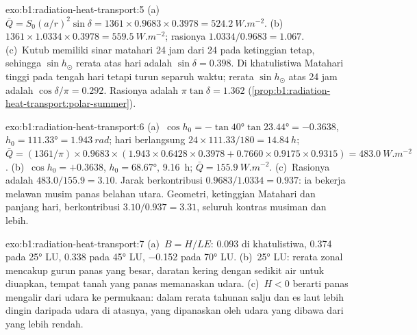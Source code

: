 \begin{solution}{exo:b1:radiation-heat-transport:5}
(a)~$\bar Q = S_0(a/r)^2\sin\delta = 1361 \times 0.9683 \times 0.3978 =
\qty{524.2}{W.m^{-2}}$. (b)~$1361 \times 1.0334 \times 0.3978 =
\qty{559.5}{W.m^{-2}}$; rasionya $1.0334/0.9683 = 1.067$. (c)~Kutub memiliki
sinar matahari 24 jam dari 24 pada ketinggian tetap, sehingga $\sin h_\odot$ rerata atas
hari adalah $\sin\delta = 0.398$. Di khatulistiwa Matahari tinggi pada tengah hari tetapi
turun separuh waktu; rerata $\sin h_\odot$ atas 24 jam adalah $\cos\delta/\pi =
0.292$. Rasionya adalah $\pi\tan\delta = 1.362$
(\cref{prop:b1:radiation-heat-transport:polar-summer}).
\end{solution}

\begin{solution}{exo:b1:radiation-heat-transport:6}
(a)~$\cos h_0 = -\tan\ang{40}\tan\ang{23.44} = -0.3638$, $h_0 = \ang{111.33} =
\qty{1.943}{rad}$; hari berlangsung $24 \times 111.33/180 = \qty{14.84}{h}$; $\bar Q =
(1361/\pi) \times 0.9683 \times (1.943 \times 0.6428 \times 0.3978 + 0.7660 \times
0.9175 \times 0.9315) = \qty{483.0}{W.m^{-2}}$. (b)~$\cos h_0 = +0.3638$, $h_0 =
\ang{68.67}$, \qty{9.16}{h}; $\bar Q = \qty{155.9}{W.m^{-2}}$. (c)~Rasionya adalah
$483.0/155.9 = 3.10$. Jarak berkontribusi $0.9683/1.0334 = 0.937$: ia bekerja melawan
musim panas belahan utara. Geometri, ketinggian Matahari dan panjang hari,
berkontribusi $3.10/0.937 = 3.31$, seluruh kontras musiman dan lebih.
\end{solution}

\begin{solution}{exo:b1:radiation-heat-transport:7}
(a)~$B = H/LE$: \num{0.093} di khatulistiwa, \num{0.374} pada \ang{25} LU,
\num{0.338} pada \ang{45} LU, \num{-0.152} pada \ang{70} LU. (b)~\ang{25} LU: rerata
zonal mencakup gurun panas yang besar, daratan kering dengan sedikit air untuk diuapkan, tempat
tanah yang panas memanaskan udara. (c)~$H < 0$ berarti panas mengalir dari udara ke
permukaan: dalam rerata tahunan salju dan es laut lebih dingin daripada udara di atasnya,
yang dipanaskan oleh udara yang dibawa dari  yang lebih rendah.
\end{solution}

